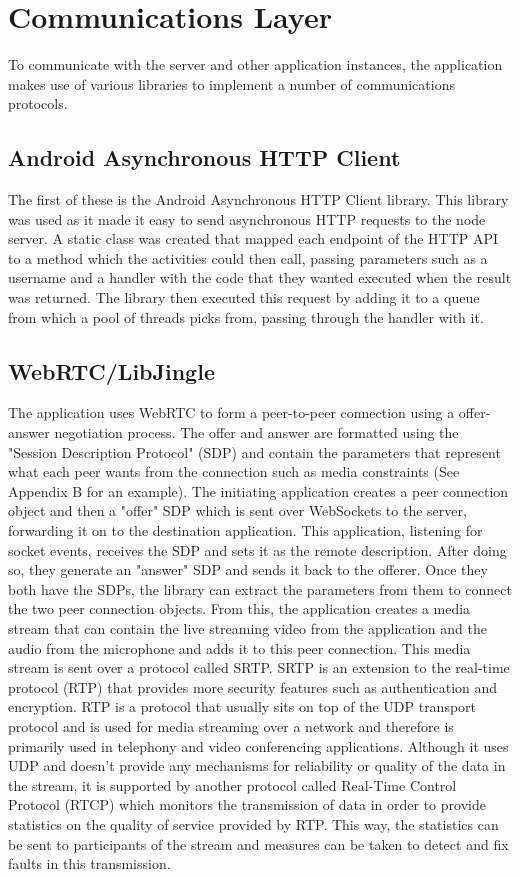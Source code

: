 \documentclass[]{report}
\begin{document}
		\section{Communications Layer}
		To communicate with the server and other application instances, the application makes use of various libraries to implement a number of communications protocols. 
		
			\subsection{Android Asynchronous HTTP Client}
			The first of these is the Android Asynchronous HTTP Client library. This library was used as it made it easy to send asynchronous HTTP requests to the node server. A static class was created that mapped each endpoint of the HTTP API to a method which the activities could then call, passing parameters such as a username and a handler with the code that they wanted executed when the result was returned. The library then executed this request by adding it to a queue from which a pool of threads picks from, passing through the handler with it.
	
			\subsection{WebRTC/LibJingle}
			The application uses WebRTC to form a peer-to-peer connection using a offer-answer negotiation process. The offer and answer are formatted using the "Session Description Protocol" (SDP) and contain the parameters that represent what each peer wants from the connection such as media constraints (See Appendix B for an example). The initiating application creates a peer connection object and then a "offer" SDP which is sent over WebSockets to the server, forwarding it on to the destination application. This application, listening for socket events, receives the SDP and sets it as the remote description. After doing so, they generate an "answer" SDP and sends it back to the offerer. Once they both have the SDPs, the library can extract the parameters from them to connect the two peer connection objects. From this, the application creates a media stream that can contain the live streaming video from the application and the audio from the microphone and adds it to this peer connection. This media stream is sent over a protocol called SRTP. SRTP is an extension to the real-time protocol (RTP) that provides more security features such as authentication and encryption. RTP is a protocol that usually sits on top of the UDP transport protocol and is used for media streaming over a network and therefore is primarily used in telephony and video conferencing applications. Although it uses UDP and doesn't provide any mechanisms for reliability or quality of the data in the stream, it is supported by another protocol called Real-Time Control Protocol (RTCP) which monitors the transmission of data in order to provide statistics on the quality of service provided by RTP. This way, the statistics can be sent to participants of the stream and measures can be taken to detect and fix faults in this transmission. 
						
\end{document}
